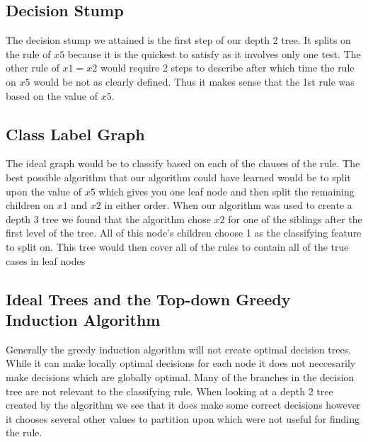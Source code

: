 \documentclass[12pt,letterpaper]{article}
\begin{document}
\subsection{Decision Stump}
The decision stump we attained is the first step of our depth 2 tree.  It splits on the rule of $x5$ because it is the quickest to satisfy as it involves only one test.  The other rule of $x1 = x2$ would require 2 steps to describe after which time the rule on $x5$ would be not as clearly defined.  Thus it makes sense that the 1st rule was based on the value of $x5$.

\subsection{Class Label Graph}
The ideal graph would be to classify based on each of the clauses of the rule.  The best possible algorithm that our algorithm could have learned would be to split upon the value of $x5$ which gives you one leaf node and then split the remaining children on $x1$ and $x2$ in either order.  When our algorithm was used to create a depth 3 tree we found that the algorithm chose $x2$ for one of the siblings after the first level of the tree.  All of this node's children choose 1 as the classifying feature to split on.  This tree would then cover all of the rules to contain all of the true cases in leaf nodes 
 
\subsection{Ideal Trees and the Top-down Greedy Induction Algorithm}
Generally the greedy induction algorithm will not create optimal decision trees.  While it can make locally optimal decisions for each node it does not neccesarily make decisions which are globally optimal.  Many of the branches in the decision tree are not relevant to the classifying rule.  When looking at a depth 2 tree created by the algorithm we see that it does make some correct decisions however it chooses several other values to partition upon which were not useful for finding the rule.  
\end{document}
